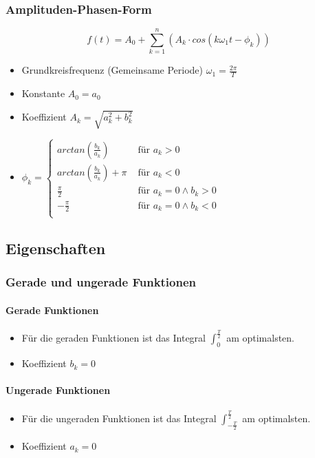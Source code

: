 \subsubsection{Amplituden-Phasen-Form}
\[
  f(t) = A_0 + \sum_{k=1}^{n}
  (A_k \cdot cos(k \omega_1 t  - \phi_k))
\]
\begin{itemize}
  \item Grundkreisfrequenz (Gemeinsame Periode) $\omega_1 = \frac{2\pi}{T}$
  \item Konstante $A_0 = a_0$
  \item Koeffizient $A_k = \sqrt{a_k^2 + b_k^2}$
  \item $\phi_k =  \begin{cases}
      arctan\left(\frac{b_k}{a_k}\right) & \text{ für } a_k > 0 \\
      arctan\left(\frac{b_k}{a_k}\right) + \pi & \text{ für } a_k < 0 \\
      \frac{\pi}{2} & \text{ für } a_k = 0 \wedge b_k > 0\\
      -\frac{\pi}{2} & \text{ für } a_k = 0 \wedge b_k < 0\\
    \end{cases}$
\end{itemize}

\subsection{Eigenschaften}
\subsubsection{Gerade und ungerade Funktionen}
\paragraph{Gerade Funktionen}
\begin{itemize}
  \item Für die geraden Funktionen ist das Integral
    $\int_0^{\frac{T}{2}}$ am optimalsten.
  \item Koeffizient $b_k = 0$
\end{itemize}
\paragraph{Ungerade Funktionen}
\begin{itemize}
  \item Für die ungeraden Funktionen ist das Integral
    $\int_{-\frac{T}{2}}^{\frac{T}{2}}$ am optimalsten.
  \item Koeffizient $a_k = 0$
\end{itemize}

